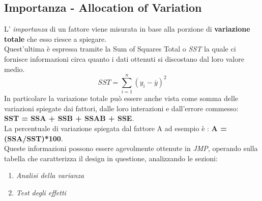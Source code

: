 \subsection{Importanza - Allocation of Variation}
L' \textit{importanza} di un fattore viene misurata in base alla porzione di \textbf{variazione totale} che esso riesce a spiegare.
\\Quest'ultima è espressa tramite la Sum of Squares Total o \textit{SST} la quale ci fornisce informazioni circa quanto i dati ottenuti si discostano dal loro valore medio.
\begin{equation*}
	SST = \sum_{i = 1}^{n}{({y_i} - \overline{y})^2}
\end{equation*}
In particolare la variazione totale può essere anche vista come somma delle variazioni spiegate dai fattori, dalle loro interazioni e dall'errore commesso:
\\\textbf{SST = {SSA + SSB + SSAB + SSE}}.
\\La percentuale di variazione spiegata dal fattore A ad esempio è : \textbf{A = (SSA/SST)*100}.
\\
Queste informazioni possono essere agevolmente ottenute in \textit{JMP}, operando sulla tabella che caratterizza il design in questione, analizzando le sezioni:
\begin{enumerate}
	\item \textit{Analisi della varianza}
	\item \textit{Test degli effetti}
\end{enumerate}
